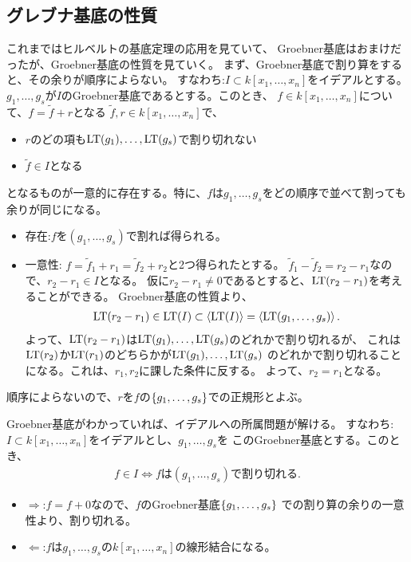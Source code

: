 \documentclass[9pt]{ltjsarticle}
\begin{document}
\subsection{グレブナ基底の性質}
\label{sub:グレブナ基底の性質}
これまではヒルベルトの基底定理の応用を見ていて、
Groebner基底はおまけだったが、Groebner基底の性質を見ていく。
まず、Groebner基底で割り算をすると、その余りが順序によらない。
すなわち:$I\subset k[x_1,\dots,x_n]$をイデアルとする。
$g_1,\dots,g_s$が$I$のGroebner基底であるとする。このとき、
$f\in k[x_1,\dots,x_n]$について、$f=\tilde f + r$となる
$\tilde f,r \in k[x_1,\dots,x_n]$で、
\begin{itemize}
  \item $r$のどの項も${\rm LT}(g_1),\dots,{\rm LT}(g_s)$で割り切れない
  \item $\tilde f \in I$となる
\end{itemize}
となるものが一意的に存在する。特に、$f$は$g_1,\dots,g_s$をどの順序で並べて割っても余りが同じになる。
\begin{myproof}
  \begin{itemize}
    \item 存在:$f$を$(g_1,\dots,g_s)$で割れば得られる。
    \item 一意性: $f=\tilde f_1 + r_1 = \tilde f_2 + r_2$と2つ得られたとする。
    $\tilde f_1 - \tilde f_2 = r_2 - r_1$なので、$r_2 - r_1 \in I$となる。
    仮に$r_2 - r_1 \neq 0$であるとすると、${\rm LT}(r_2-r_1)$を考えることができる。
    Groebner基底の性質より、
    \begin{align}
      {\rm LT}(r_2-r_1) \in {\rm LT}(I) \subset \left\langle {\rm LT}(I) \right\rangle
      =
       \left\langle {\rm LT}(g_1,\dots,g_s) \right\rangle.
    \end{align}
    よって、${\rm LT}(r_2-r_1)$は${\rm LT}(g_1),\dots,{\rm LT}(g_s)$のどれかで割り切れるが、
    これは${\rm LT}(r_2)$か${\rm LT}(r_1)$のどちらかが${\rm LT}(g_1),\dots,{\rm LT}(g_s)$
    のどれかで割り切れることになる。これは、$r_1,r_2$に課した条件に反する。
    よって、$r_2 =r_1$となる。
  \end{itemize}
\end{myproof}

順序によらないので、$r$を$f$の$\left\{g_1,\dots,g_s\right\}$での正規形とよぶ。

Groebner基底がわかっていれば、イデアルへの所属問題が解ける。
すなわち:$I\subset k[x_1,\dots,x_n]$をイデアルとし、$g_1,\dots,g_s$を
このGroebner基底とする。このとき、
\begin{align}
  f \in I \iff f は (g_1,\dots,g_s) で割り切れる .
\end{align}
\begin{myproof}
  \begin{itemize}
    \item $\Rightarrow$:$f=f+0$なので、$f$のGroebner基底$\left\{g_1,\dots,g_s\right\}$
    での割り算の余りの一意性より、割り切れる。
    \item $\Leftarrow$:$f$は$g_1,\dots,g_s$の$k[x_1,\dots,x_n]$の線形結合になる。
  \end{itemize}
\end{myproof}
\end{document}
